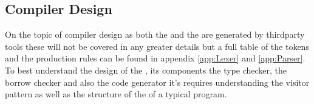 \subsection{Compiler Design}
\label{sec:CompilerDesign}

On the topic of compiler design as both the \lexer{} and the \parser{}
are generated by thirdparty tools these will not be covered in any greater details
but a full table of the tokens and the production rules can be found in appendix
\ref{app:Lexer} and \ref{app:Parser}. To best understand the design of the
\static, its components the type checker, the borrow checker and also the code
generator it's requires understanding the visitor pattern as well as the
structure of the \ast{} of a typical \lang{} program.








